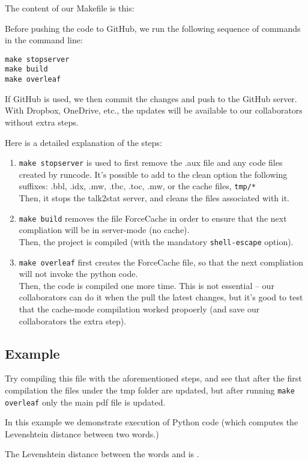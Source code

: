 \documentclass[12pt]{article}
\begin{document}
The content of our Makefile is this:

Before pushing the code to GitHub, we run the following sequence of commands in the command line:
\begin{tcolorbox}
\begin{Verbatim}
make stopserver
make build
make overleaf
\end{Verbatim}
\end{tcolorbox}
If GitHub is used, we then commit the changes and push to the GitHub server. With Dropbox, OneDrive, etc., the updates will be available to our collaborators without extra steps.

Here is a detailed explanation of the steps:
\begin{enumerate}
 \item \verb|make stopserver| is used to first remove the .aux file and any code files created by runcode. It's possible to add to the clean option the following suffixes: .bbl, .idx, .mw, .tbc, .toc, .mw, or the cache files, \verb|tmp/*|\\
 Then, it stops the talk2stat server, and cleans the files associated with it.
 \item \verb|make build| removes the file ForceCache in order to ensure that the next compliation will be in server-mode (no cache).\\
 Then, the project is compiled (with the mandatory \verb|shell-escape| option).
 \item \verb|make overleaf| first creates the ForceCache file, so that the next compliation will not invoke the python code.\\
 Then, the code is compiled one more time. This is not essential -- our collaborators can do it when the pull the latest changes, but it's good to test that the cache-mode compilation worked propoerly (and save our collaborators the extra step).
\end{enumerate}


\subsection*{Example}
Try compiling this file with the aforementioned steps, and see that after the first compilation the files under the tmp folder are updated, but after running \verb|make overleaf| only the main pdf file is updated.

In this example we demonstrate execution of Python code (which computes the Levenshtein distance between two words.)


The Levenshtein distance between the words  and  is .
\end{document}
